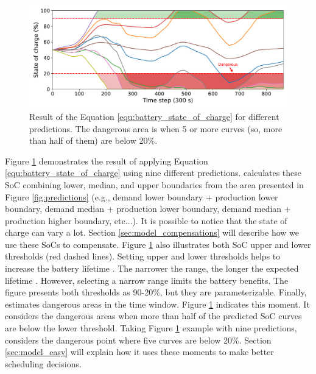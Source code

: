 \begin{figure}[!htb]
    \centering
    \includegraphics[scale=0.5]{Images/Heuristic/state_of_charge.pdf}
    \caption{Result of the Equation \ref{equ:battery_state_of_charge} for different predictions. The dangerous area is when 5 or more curves (so, more than half of them) are below 20\%.}
    \label{fig:estimated_state_of_charge}
\end{figure}

Figure \ref{fig:estimated_state_of_charge} demonstrates the result of applying Equation \ref{equ:battery_state_of_charge} using nine different predictions. \emph{\systemName} calculates these SoC combining lower, median, and upper boundaries from the area presented in Figure \ref{fig:predictions} (e.g., demand lower boundary + production lower boundary, demand median + production lower boundary, demand median + production higher boundary, etc...). It is possible to notice that the state of charge can vary a lot. Section \ref{sec:model_compensations} will describe how we use these SoCs to compensate. Figure \ref{fig:estimated_state_of_charge} also illustrates both SoC upper and lower thresholds (red dashed lines). Setting upper and lower thresholds helps to increase the battery lifetime \cite{xu2016modeling}. The narrower the range, the longer the expected lifetime \cite{xu2016modeling}. However, selecting a narrow range limits the battery benefits. The figure presents both thresholds as 90-20\%, but they are parameterizable. Finally, \emph{\systemName} estimates dangerous areas in the time window. Figure \ref{fig:estimated_state_of_charge} indicates this moment. It considers the dangerous areas when more than half of the predicted SoC curves are below the lower threshold. Taking Figure \ref{fig:estimated_state_of_charge} example with nine predictions, \emph{\systemName} considers the dangerous point where five curves are below 20\%. Section \ref{sec:model_easy} will explain how it uses these moments to make better scheduling decisions.


